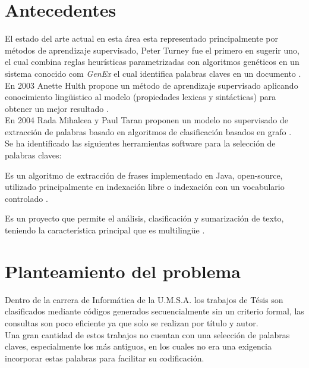 \section{Antecedentes}
El estado del arte actual en esta \'area esta representado principalmente por
m\'etodos de aprendizaje supervisado, Peter Turney fue el primero en sugerir uno,
el cual combina reglas heur\'isticas parametrizadas con algoritmos gen\'eticos
en un sistema conocido com \emph{GenEx} el cual identifica palabras claves en un
documento \cite{PT99}. \\

En 2003 Anette Hulth propone un m\'etodo de aprendizaje supervisado aplicando
conocimiento ling\"uistico al modelo (propiedades lexicas y sint\'acticas) para obtener
un mejor resultado \cite{AH03}. \\

En 2004 Rada Mihalcea y Paul Taran proponen un modelo no supervisado de extracci\'on
de palabras basado en algoritmos de clasificaci\'on basados en grafo \cite{RMPT04}. \\

Se ha identificado las siguientes herramientas software para la selecci\'on de
palabras claves:
\begin{description}[leftmargin=0cm]
	\item[Kea] Es un algoritmo de extracci\'on de frases implementado en Java,
	open-source, utilizado principalmente en indexaci\'on libre  o indexaci\'on con
	un vocabulario controlado \cite{KEA}.
	\item[Texlexan] Es un proyecto que permite el an\'alisis, clasificaci\'on y
	sumarizaci\'on de texto, teniendo la caracter\'istica principal que es 
	multiling\"ue \cite{TEXLEXAN}.
\end{description}


\section{Planteamiento del problema}
Dentro de la carrera de Inform\'atica de la U.M.S.A. los trabajos de T\'esis son
clasificados mediante c\'odigos generados secuencialmente sin un criterio formal, las
consultas son poco eficiente ya que solo se realizan por t\'itulo y autor. \\

Una gran cantidad de estos trabajos no cuentan con una selecci\'on de palabras claves,
especialmente los m\'as antiguos, en los cuales no era una exigencia incorporar estas
palabras para facilitar su codificaci\'on. \\

